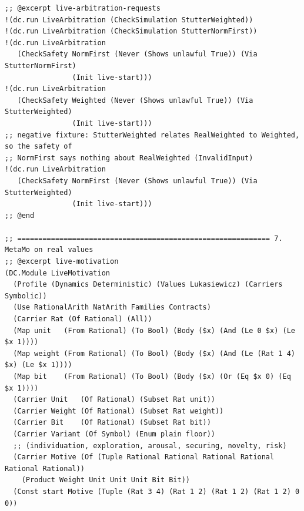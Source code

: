 \documentclass[11pt]{article}
\theoremstyle{definition}
\theoremstyle{plain}
\begin{document}
\begin{lstlisting}[style=mettafull]
;; @excerpt live-arbitration-requests
!(dc.run LiveArbitration (CheckSimulation StutterWeighted))
!(dc.run LiveArbitration (CheckSimulation StutterNormFirst))
!(dc.run LiveArbitration
   (CheckSafety NormFirst (Never (Shows unlawful True)) (Via StutterNormFirst)
                (Init live-start)))
!(dc.run LiveArbitration
   (CheckSafety Weighted (Never (Shows unlawful True)) (Via StutterWeighted)
                (Init live-start)))
;; negative fixture: StutterWeighted relates RealWeighted to Weighted, so the safety of
;; NormFirst says nothing about RealWeighted (InvalidInput)
!(dc.run LiveArbitration
   (CheckSafety NormFirst (Never (Shows unlawful True)) (Via StutterWeighted)
                (Init live-start)))
;; @end

;; ============================================================ 7. MetaMo on real values
;; @excerpt live-motivation
(DC.Module LiveMotivation
  (Profile (Dynamics Deterministic) (Values Lukasiewicz) (Carriers Symbolic))
  (Use RationalArith NatArith Families Contracts)
  (Carrier Rat (Of Rational) (All))
  (Map unit   (From Rational) (To Bool) (Body ($x) (And (Le 0 $x) (Le $x 1))))
  (Map weight (From Rational) (To Bool) (Body ($x) (And (Le (Rat 1 4) $x) (Le $x 1))))
  (Map bit    (From Rational) (To Bool) (Body ($x) (Or (Eq $x 0) (Eq $x 1))))
  (Carrier Unit   (Of Rational) (Subset Rat unit))
  (Carrier Weight (Of Rational) (Subset Rat weight))
  (Carrier Bit    (Of Rational) (Subset Rat bit))
  (Carrier Variant (Of Symbol) (Enum plain floor))
  ;; (individuation, exploration, arousal, securing, novelty, risk)
  (Carrier Motive (Of (Tuple Rational Rational Rational Rational Rational Rational))
    (Product Weight Unit Unit Unit Bit Bit))
  (Const start Motive (Tuple (Rat 3 4) (Rat 1 2) (Rat 1 2) (Rat 1 2) 0 0))


\end{lstlisting}
\end{document}
